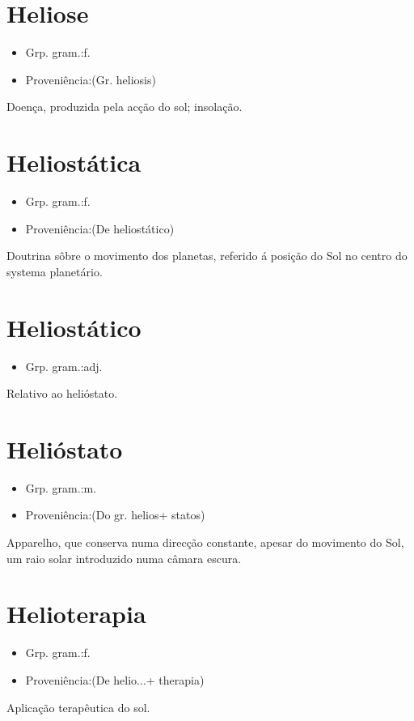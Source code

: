 \documentclass{article}
\begin{document}
\section{Heliose}
\begin{itemize}
\item {Grp. gram.:f.}
\end{itemize}
\begin{itemize}
\item {Proveniência:(Gr. \textunderscore heliosis\textunderscore )}
\end{itemize}
Doença, produzida pela acção do sol; insolação.
\section{Heliostática}
\begin{itemize}
\item {Grp. gram.:f.}
\end{itemize}
\begin{itemize}
\item {Proveniência:(De \textunderscore heliostático\textunderscore )}
\end{itemize}
Doutrina sôbre o movimento dos planetas, referido á posição do Sol no centro do systema planetário.
\section{Heliostático}
\begin{itemize}
\item {Grp. gram.:adj.}
\end{itemize}
Relativo ao helióstato.
\section{Helióstato}
\begin{itemize}
\item {Grp. gram.:m.}
\end{itemize}
\begin{itemize}
\item {Proveniência:(Do gr. \textunderscore helios\textunderscore  + \textunderscore statos\textunderscore )}
\end{itemize}
Apparelho, que conserva numa direcção constante, apesar do movimento do Sol, um raio solar introduzido numa câmara escura.
\section{Helioterapia}
\begin{itemize}
\item {Grp. gram.:f.}
\end{itemize}
\begin{itemize}
\item {Proveniência:(De \textunderscore helio...\textunderscore  + \textunderscore therapia\textunderscore )}
\end{itemize}
Aplicação terapêutica do sol.
\end{document}
